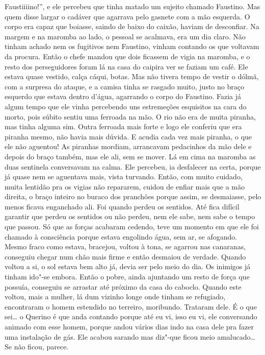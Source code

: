 \begin{linenumbers}
Faustiiiino!'', e ele percebeu que tinha matado um sujeito chamado
Faustino. Mas quem disse largar o cadáver que agarrava pelo gasnete com
a mão esquerda. O corpo era capaz que boiasse, saindo de baixo do
caixão, haviam de desconfiar. Na margem e na maromba ao lado, o pessoal
se acalmava, era um dia claro. Não tinham achado nem os fugitivos nem
Faustino, vinham contando os que voltavam da procura. Então o chefe
mandou que dois ficassem de vigia na maromba, e o resto dos
perseguidores foram lá na casa do caipira ver se faziam um café. Ele
estava quase vestido, calça cáqui, botas. Mas não tivera tempo de vestir
o dólmã, com a surpresa do ataque, e a camisa tinha se rasgado muito,
justo no braço esquerdo que estava dentro d'água, agarrando o corpo do
Faustino. Fazia já algum tempo que ele vinha percebendo uns estremeções
esquisitos na cara do morto, pois súbito sentiu uma ferroada na mão. O
rio não era de muita piranha, mas tinha alguma sim. Outra ferroada mais
forte e logo ele conferiu que era piranha mesmo, não havia mais dúvida.
E acudia cada vez mais piranha, o que ele não aguentou! As piranhas
mordiam, arrancavam pedacinhos da mão dele e depois do braço também, mas
ele ali, sem se mover. Lá em cima na maromba as duas sentinela
conversavam na calma. Ele percebeu, ia desfalecer na certa, porque já
quase nem se aguentava mais, vista turvando. Então, com muito cuidado,
muita lentidão pra os vigias não repararem, cuidou de enfiar mais que a
mão direita, o braço inteiro no buraco dos pranchões porque assim, se
desmaiasse, pelo menos ficava enganchado ali. Foi quando perdeu os
sentidos. Até fica difícil garantir que perdeu os sentidos ou não
perdeu, nem ele sabe, nem sabe o tempo que passou. Só que as forças
acabaram cedendo, teve um momento em que ele foi chamado à consciência
porque estava engolindo água, sem ar, se afogando. Mesmo fraco como
estava, bracejou, voltou à tona, se agarrou nas canaranas, conseguiu
chegar num chão mais firme e então desmaiou de verdade. Quando voltou a
si, o sol estava bem alto já, devia ser pelo meio do dia. Os inimigos já
tinham ido"-se embora. Então o pobre, ainda ajuntando um resto de força
que possuía, conseguiu se arrastar até próximo da casa do caboclo.
Quando este voltou, mais a mulher, lá dum vizinho longe onde tinham se
refugiado, encontraram o homem estendido no terreiro, moribundo.
Trataram dele. É o que sei\ldots{} o Querino é que anda contando porque até
eu vi, isso eu vi, ele conversando animado com esse homem, porque andou
vários dias indo na casa dele pra fazer uma instalação de gás. Ele
acabou sarando mas diz"-que ficou meio amalucado\ldots{} Se não ficou, parece.


\end{linenumbers}
